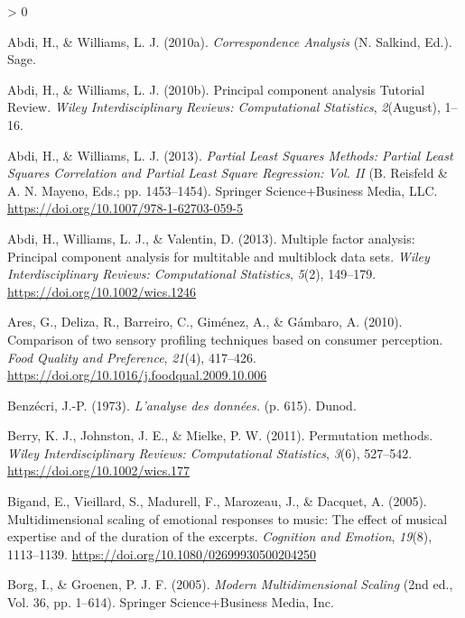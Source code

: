 \documentclass[
  english,
  man,floatsintext]{apa6}
\newlength{\cslhangindent}
\newenvironment{CSLReferences}[2] %
 {%
  \setlength{\parindent}{0pt}
  \ifodd #1 \everypar{\setlength{\hangindent}{\cslhangindent}}\ignorespaces\fi
  \ifnum #2 > 0
  \setlength{\parskip}{#2\baselineskip}
  \fi
 }%
 {}
\begin{document}
\hypertarget{refs}{}
\begin{CSLReferences}{1}{0}
\leavevmode\hypertarget{ref-Abdi2010d}{}%
Abdi, H., \& Williams, L. J. (2010a). \emph{{Correspondence Analysis}} (N. Salkind, Ed.). Sage.

\leavevmode\hypertarget{ref-Abdi2010f}{}%
Abdi, H., \& Williams, L. J. (2010b). {Principal component analysis Tutorial Review}. \emph{Wiley Interdisciplinary Reviews: Computational Statistics}, \emph{2}(August), 1--16.

\leavevmode\hypertarget{ref-Abdi2013a}{}%
Abdi, H., \& Williams, L. J. (2013). \emph{{Partial Least Squares Methods: Partial Least Squares Correlation and Partial Least Square Regression}: Vol. II} (B. Reisfeld \& A. N. Mayeno, Eds.; pp. 1453--1454). Springer Science+Business Media, LLC. \url{https://doi.org/10.1007/978-1-62703-059-5}

\leavevmode\hypertarget{ref-Abdi2013}{}%
Abdi, H., Williams, L. J., \& Valentin, D. (2013). {Multiple factor analysis: Principal component analysis for multitable and multiblock data sets}. \emph{Wiley Interdisciplinary Reviews: Computational Statistics}, \emph{5}(2), 149--179. \url{https://doi.org/10.1002/wics.1246}

\leavevmode\hypertarget{ref-Ares2010}{}%
Ares, G., Deliza, R., Barreiro, C., Giménez, A., \& Gámbaro, A. (2010). {Comparison of two sensory profiling techniques based on consumer perception}. \emph{Food Quality and Preference}, \emph{21}(4), 417--426. \url{https://doi.org/10.1016/j.foodqual.2009.10.006}

\leavevmode\hypertarget{ref-Benzecri1973}{}%
Benzécri, J.-P. (1973). \emph{{L'analyse des données.}} (p. 615). Dunod.

\leavevmode\hypertarget{ref-Berry2011}{}%
Berry, K. J., Johnston, J. E., \& Mielke, P. W. (2011). {Permutation methods}. \emph{Wiley Interdisciplinary Reviews: Computational Statistics}, \emph{3}(6), 527--542. \url{https://doi.org/10.1002/wics.177}

\leavevmode\hypertarget{ref-Bigand2005}{}%
Bigand, E., Vieillard, S., Madurell, F., Marozeau, J., \& Dacquet, A. (2005). {Multidimensional scaling of emotional responses to music: The effect of musical expertise and of the duration of the excerpts}. \emph{Cognition and Emotion}, \emph{19}(8), 1113--1139. \url{https://doi.org/10.1080/02699930500204250}

\leavevmode\hypertarget{ref-Borg2005}{}%
Borg, I., \& Groenen, P. J. F. (2005). \emph{{Modern Multidimensional Scaling}} (2nd ed., Vol. 36, pp. 1--614). Springer Science+Business Media, Inc.


\end{CSLReferences}
\end{document}
